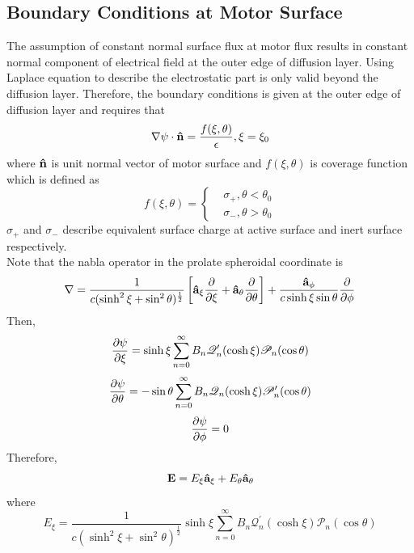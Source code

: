 \documentclass[fontsize=11pt, %
                             paper=a4, %
                             twoside, %
                             captions=tableheading,
                             index=totoc,
                             hyperref]{labbook}
\begin{document}
\begin{addmargin}[4cm]{0cm}
\subsection{Boundary Conditions at Motor Surface}
The assumption of constant normal surface flux at motor flux results in constant normal component of electrical field at the outer edge of diffusion layer. Using Laplace equation to describe the electrostatic part is only valid beyond the diffusion layer. Therefore, the boundary conditions is given at the outer edge of diffusion layer and requires that
\begin{equation}
\nabla\psi \cdot \mathbf{\hat{n}}= \frac{f(\xi,\theta)}{\epsilon},\xi=\xi_0
\end{equation}
where $\mathbf{\hat{n}}$ is unit normal vector of motor surface and $f(\xi,\theta)$ is coverage function which is defined as
\begin{equation}
f(\xi,\theta)=
\begin{cases}
&\sigma_+,\theta<\theta_0\\
&\sigma_-,\theta>\theta_0
\end{cases}
\end{equation}
$\sigma_+$ and $\sigma_-$ describe equivalent surface charge at active surface and inert surface respectively.\\
Note that the nabla operator in the prolate spheroidal coordinate is
\begin{equation}
\nabla=\frac{1}{c(\sinh^2\xi+\sin^2\theta)^{\frac{1}{2}}}\left[\mathbf{\hat{a}}_{\xi} \frac{\partial }{\partial \xi}+\mathbf{\hat{a}}_{\theta}\frac{\partial }{\partial \theta}\right]+\frac{\mathbf{\hat{a}}_{\phi}}{c\sinh\xi\sin\theta}\frac{\partial }{\partial \phi}
\end{equation}
Then,
\begin{equation}
\frac{\partial \psi}{\partial \xi}=\sinh\xi\sum_{n=0}^\infty B_n \mathscr{Q}_n^\prime(\cosh\xi)\mathscr{P}_n(\cos\theta)
\end{equation}
\begin{equation}
\frac{\partial \psi}{\partial \theta}=-\sin\theta\sum_{n=0}^\infty B_n\mathscr{Q}_n(\cosh\xi)\mathscr{P}_n^\prime(\cos\theta)
\end{equation}
\begin{equation}
\frac{\partial \psi}{\partial \phi}=0
\end{equation}
Therefore,
\begin{equation}
\mathbf{E}=E_\xi \mathbf{\hat{a}}_\xi+E_\theta\mathbf{\hat{a}}_\theta
\end{equation}
where
\begin{equation}
E_\xi=\frac{1}{c(\sinh^2\xi+\sin^2\theta)^{\frac{1}{2}}}\sinh\xi\sum_{n=0}^\infty B_n \mathscr{Q}_n^\prime(\cosh\xi)\mathscr{P}_n(\cos\theta)

\end{equation}
\end{addmargin}
\end{document}
